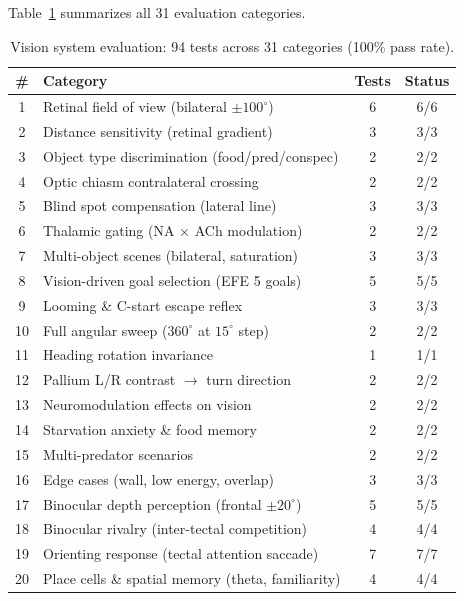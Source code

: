 \documentclass[11pt,a4paper]{article}
\begin{document}
Table~\ref{tab:vision_eval} summarizes all 31 evaluation categories.

\begin{table}[H]
\centering
\caption{Vision system evaluation: 94 tests across 31 categories (100\% pass rate).}
\label{tab:vision_eval}
\small
\begin{tabular}{clcc}
\toprule
\# & Category & Tests & Status \\
\midrule
 1 & Retinal field of view (bilateral $\pm100^\circ$)  & 6 & 6/6 \\
 2 & Distance sensitivity (retinal gradient)            & 3 & 3/3 \\
 3 & Object type discrimination (food/pred/conspec)     & 2 & 2/2 \\
 4 & Optic chiasm contralateral crossing                & 2 & 2/2 \\
 5 & Blind spot compensation (lateral line)             & 3 & 3/3 \\
 6 & Thalamic gating (NA $\times$ ACh modulation)       & 2 & 2/2 \\
 7 & Multi-object scenes (bilateral, saturation)        & 3 & 3/3 \\
 8 & Vision-driven goal selection (EFE 5 goals)         & 5 & 5/5 \\
 9 & Looming \& C-start escape reflex                   & 3 & 3/3 \\
10 & Full angular sweep ($360^\circ$ at $15^\circ$ step)& 2 & 2/2 \\
11 & Heading rotation invariance                        & 1 & 1/1 \\
12 & Pallium L/R contrast $\to$ turn direction          & 2 & 2/2 \\
13 & Neuromodulation effects on vision                  & 2 & 2/2 \\
14 & Starvation anxiety \& food memory                  & 2 & 2/2 \\
15 & Multi-predator scenarios                           & 2 & 2/2 \\
16 & Edge cases (wall, low energy, overlap)             & 3 & 3/3 \\
17 & Binocular depth perception (frontal $\pm20^\circ$) & 5 & 5/5 \\
18 & Binocular rivalry (inter-tectal competition)       & 4 & 4/4 \\
19 & Orienting response (tectal attention saccade)      & 7 & 7/7 \\
20 & Place cells \& spatial memory (theta, familiarity) & 4 & 4/4 \\

\end{tabular}
\end{table}
\end{document}
